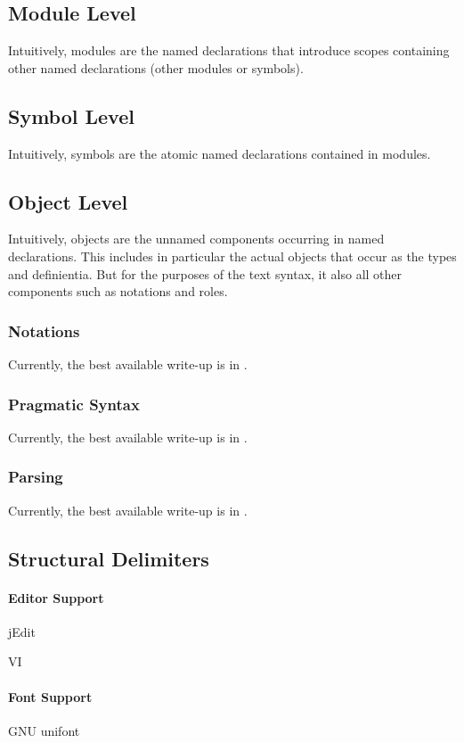 \subsection{Module Level}

Intuitively, modules are the named declarations that introduce scopes containing other named declarations (other modules or symbols).

\subsection{Symbol Level}

Intuitively, symbols are the atomic named declarations contained in modules.

\subsection{Object Level}

Intuitively, objects are the unnamed components occurring in named declarations.
This includes in particular the actual {\mmt} objects that occur as the types and definientia.
But for the purposes of the text syntax, it also all other components such as notations and roles.

\subsubsection{Notations}

Currently, the best available write-up is in \cite{GIR:latex-mmt:13}.

\subsubsection{Pragmatic Syntax}

Currently, the best available write-up is in \cite{GIR:mmtlatex:13}.

\subsubsection{Parsing}

Currently, the best available write-up is in \cite{GIR:mmtlatex:13}.

\subsection{Structural Delimiters}

\paragraph{Editor Support}

jEdit

VI


\paragraph{Font Support}

GNU unifont